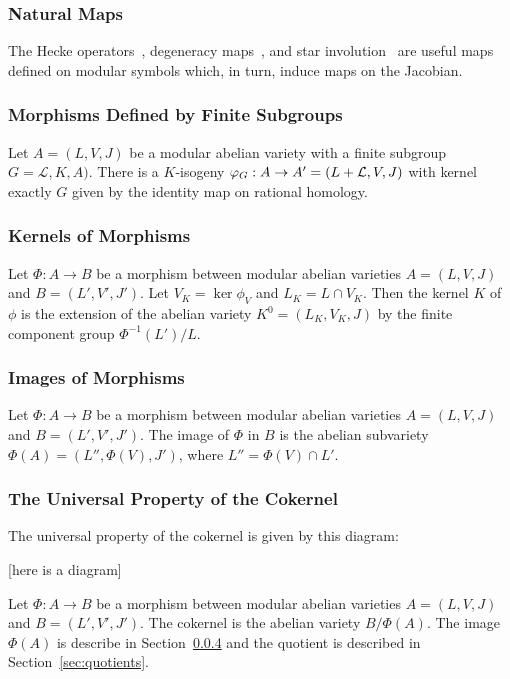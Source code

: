 \documentclass{article}
\begin{document}
\subsubsection{Natural Maps}
\label{sec:natural_maps}
The Hecke operators~\cite[\S 8.3]{stein:modular_forms:2007}, degeneracy maps~\cite[\S
8.6]{stein:modular_forms:2007}, and star involution~\cite[\S
8.5]{stein:modular_forms:2007} are
useful maps defined on modular symbols which, in turn, induce maps on the
Jacobian.

\subsubsection{Morphisms Defined by Finite Subgroups}

Let $A=(L, V, J)$ be a modular abelian variety with a finite subgroup
$G=\mathcal{L}, K, A)$. There is a $K$-isogeny $\varphi_G: A\to
A'=(L+\mathcal{L}, V, J)$ with kernel exactly $G$ given by the identity map on
rational homology.

\subsubsection{Kernels of Morphisms}
\label{sec:kernelmodabvar}

Let $\Phi:A\to B$ be a morphism between modular abelian varieties $A=(L, V, J)$
and $B=(L', V', J')$. Let $V_K=\ker \phi_V$ and $L_K=L\cap V_K$. Then the
kernel $K$ of $\phi$ is the extension of the abelian variety $K^0 = (L_K, V_K,
J)$ by the finite component group $\Phi^{-1}(L')/L$.

\subsubsection{Images of Morphisms}
\label{sec:image}

Let $\Phi:A\to B$ be a morphism between modular abelian varieties $A=(L, V, J)$
and $B=(L', V', J')$. The image of $\Phi$ in $B$ is the abelian subvariety
$\Phi(A)=(L'', \Phi(V), J')$, where $L''=\Phi(V)\cap L'$.


\subsubsection{The Universal Property of the Cokernel}

The universal property of the cokernel is given by this diagram:

[here is a diagram]

Let $\Phi:A\to B$ be a morphism between modular abelian varieties $A=(L, V, J)$
and $B=(L', V', J')$. The cokernel is the abelian variety $B/\Phi(A)$. The
image $\Phi(A)$ is describe in Section~\ref{sec:image} and the quotient is
described in Section~\ref{sec:quotients}.
\end{document}
